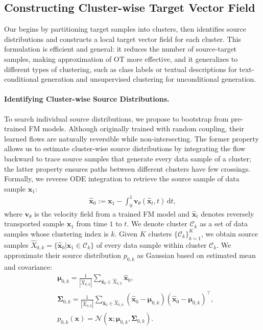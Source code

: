 \subsection{Constructing Cluster-wise Target Vector Field}
\label{sec:clustering}

Our \method{} begins by partitioning target samples into clusters, then identifies source distributions and constructs a local target vector field for each cluster.  This formulation is efficient and general: it reduces the number of source-target samples, making approximation of OT more effective, and it generalizes to different types of clustering, such as class labels or textual descriptions for text-conditional generation and unsupervised clustering for unconditional generation.

\paragraph{Identifying Cluster-wise Source Distributions.}
To search individual source distributions, we propose to bootstrap from pre-trained FM models. Although originally trained with random coupling, their learned flows are naturally reversible while non-intersecting.  The former property allows us to estimate cluster-wise source distributions by integrating the flow backward to trace source samples that generate every data sample of a cluster; the latter property ensures paths between different clusters have few crossings.
Formally, we reverse ODE integration to retrieve the source sample of data sample $\bm{x}_{1}$:
\begin{align}
    \hat{\bm{x}}_{0} := \bm{x}_{1} - \int_0^1 \bm{v}_\theta(\hat{\bm{x}}_t, t) \, \mathrm{d}t,
    \label{eq:reverse_ode}
\end{align}
where $\bm{v}_\theta$ is the velocity field from a trained FM model and $\hat{\bm{x}}_t$ denotes reversely transported sample $\bm{x}_1$ from time $1$ to $t$.  We denote cluster $\mathcal{C}_k$ as a set of data samples whose clustering index is $k$.  Given $K$ clusters $\{\mathcal{C}_k\}_{k=1}^K$, we obtain source samples $\hat{X}_{0, k} = \{\hat{\bm{x}}_0 | \bm{x}_1 \in \mathcal{C}_k\}$ of every data sample within cluster $\mathcal{C}_k$.  We approximate their source distribution $p_{0, k}$ as Gaussian based on estimated mean and covariance:
\begin{align}
&\bm{\mu}_{0, k} = \frac{1}{|\hat{X}_{0, k}|}\sum_{\hat{\bm{x}}_0 \in \hat{X}_{0, k}} \hat{\bm{x}}_0, \label{eq:cluster_mean}\\
&\bm{\Sigma}_{0, k} = \frac{1}{|\hat{X}_{0, k}|} \sum_{\hat{\bm{x}}_0 \in \hat{X}_{0, k}} (\hat{\bm{x}}_0 - \bm{\mu}_{0, k})(\hat{\bm{x}}_0 - \bm{\mu}_{0, k})^\top, \\
&p_{0, k}(\bm{x}) = \mathcal{N}(\bm{x}; \bm{\mu}_{0, k}, \bm{\Sigma}_{0, k}).
\label{eq:cluster_cov}
\end{align}

